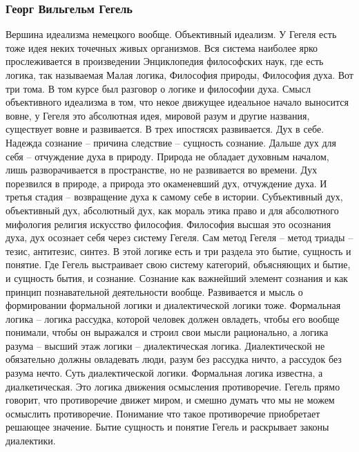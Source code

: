 \documentclass[a4paper, 12pt]{article}
\begin{document}
\subsubsection{Георг Вильгельм Гегель}

Вершина идеализма немецкого вообще. Объективный идеализм. У Гегеля есть 
тоже идея неких точечных живых организмов. Вся система наиболее ярко 
прослеживается в произведении Энциклопедия философских наук, где есть 
логика, так называемая Малая логика, Философия природы, Философия духа. 
Вот три тома. В том курсе был разговор о логике и философии духа. Смысл 
объективного идеализма в том, что некое движущее идеальное начало 
выносится вовне, у Гегеля это абсолютная идея, мировой разум и другие 
названия, существует вовне и развивается. В трех ипостясях развивается. 
Дух в себе. Надежда сознание -- причина следствие -- сущность сознание. 
Дальше дух для себя -- отчуждение духа в природу. Природа не обладает 
духовным началом, лишь разворачивается в пространстве, но не развивается 
во времени. Дух порезвился в природе, а природа это окаменевший дух, 
отчуждение духа. И третья стадия -- возвращение духа к самому себе 
в истории. Субъективный дух, объективный дух, абсолютный дух, как мораль 
этика право и для абсолютного мифология религия искусство философия. 
Философия высшая это осознания духа, дух осознает себя через систему 
Гегеля. Сам метод Гегеля -- метод триады -- тезис, антитезис, синтез. 
В этой логике есть и три раздела это бытие, сущность и понятие. Где 
Гегель выстраивает свою систему категорий, объясняющих и бытие, 
и сущность бытия, и сознание. Сознание как важнейший элемент сознания 
и как принцип познавательной деятельности вообще. Развивается и мысль 
о формировании формальной логики и диалектической логики тоже. 
Формальная логика -- логика рассудка, которой человек должен овладеть, 
чтобы его вообще понимали, чтобы он выражался и строил свои мысли 
рационально, а логика разума -- высший этаж логики -- диалектическая 
логика. Диалектической не обязательно должны овладевать люди, разум без 
рассудка ничто, а рассудок без разума нечто. Суть диалектической логики. 
Формальная логика известна, а диалкетическая. Это логика движения 
осмысления противоречие. Гегель прямо говорит, что противоречие движет 
миром, и смешно думать что мы не можем осмыслить противоречие. Понимание 
что такое противоречие приобретает решающее значение. Бытие сущность 
и понятие Гегель и раскрывает законы диалектики.
\end{document}

